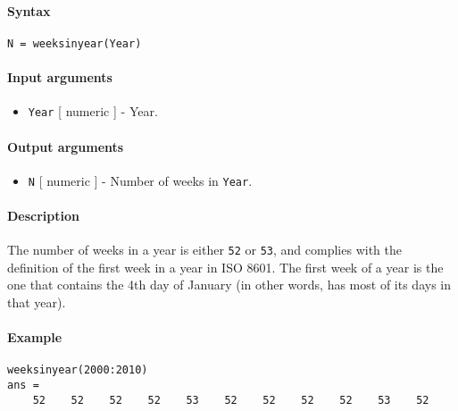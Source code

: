 


	\paragraph{Syntax}

\begin{verbatim}
N = weeksinyear(Year)
\end{verbatim}

\paragraph{Input arguments}

\begin{itemize}
\itemsep1pt\parskip0pt
\item
  \texttt{Year} {[} numeric {]} - Year.
\end{itemize}

\paragraph{Output arguments}

\begin{itemize}
\itemsep1pt\parskip0pt
\item
  \texttt{N} {[} numeric {]} - Number of weeks in \texttt{Year}.
\end{itemize}

\paragraph{Description}

The number of weeks in a year is either \texttt{52} or \texttt{53}, and
complies with the definition of the first week in a year in ISO 8601.
The first week of a year is the one that contains the 4th day of January
(in other words, has most of its days in that year).

\paragraph{Example}

\begin{verbatim}
weeksinyear(2000:2010)
ans =
    52    52    52    52    53    52    52    52    52    53    52
\end{verbatim}


